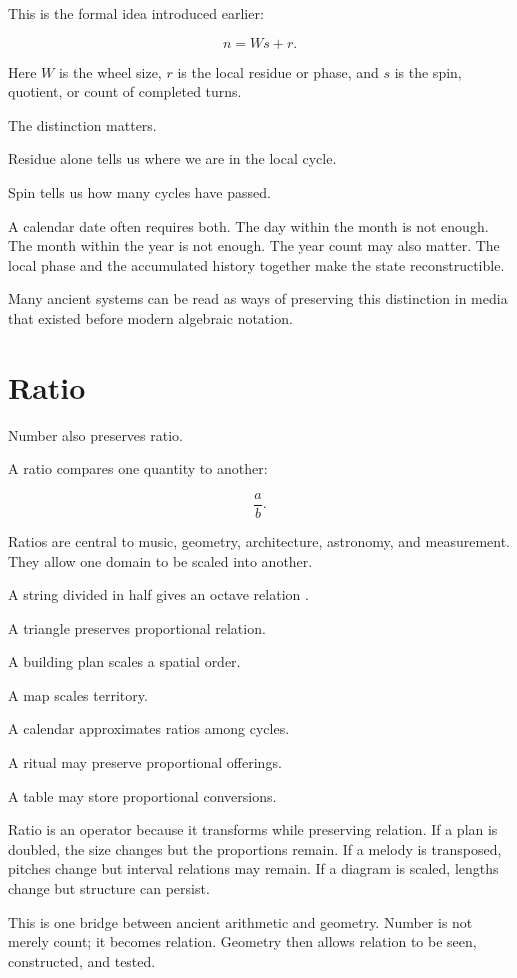 \documentclass[11pt]{book}
\begin{document}
This is the formal idea introduced earlier:

\[
n = Ws + r.
\]

Here \(W\) is the wheel size, \(r\) is the local residue or phase, and \(s\) is the spin, quotient, or count of completed turns.

The distinction matters.

Residue alone tells us where we are in the local cycle.

Spin tells us how many cycles have passed.

A calendar date often requires both. The day within the month is not enough. The month within the year is not enough. The year count may also matter. The local phase and the accumulated history together make the state reconstructible.

Many ancient systems can be read as ways of preserving this distinction in media that existed before modern algebraic notation.

\section{Ratio}

Number also preserves ratio.

A ratio compares one quantity to another:

\[
\frac{a}{b}.
\]

Ratios are central to music, geometry, architecture, astronomy, and measurement. They allow one domain to be scaled into another.

A string divided in half gives an octave relation \cite{Barker1989GreekMusicalWritings}.

A triangle preserves proportional relation.

A building plan scales a spatial order.

A map scales territory.

A calendar approximates ratios among cycles.

A ritual may preserve proportional offerings.

A table may store proportional conversions.

Ratio is an operator because it transforms while preserving relation. If a plan is doubled, the size changes but the proportions remain. If a melody is transposed, pitches change but interval relations may remain. If a diagram is scaled, lengths change but structure can persist.

This is one bridge between ancient arithmetic and geometry. Number is not merely count; it becomes relation. Geometry then allows relation to be seen, constructed, and tested.
\end{document}
